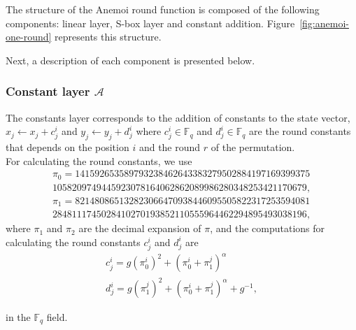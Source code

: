 The structure of the Anemoi round function is composed of the following components: linear layer, S-box layer and constant addition. Figure~\ref{fig:anemoi-one-round} represents this structure.

Next, a description of each component is presented below.

\subsubsection*{Constant layer $\mathcal{A}$}
The constants layer corresponds to the addition of constants to the state vector, $x_j\leftarrow x_j+c_j^i$ and $y_j\leftarrow y_j+d_j^i$ where $c_j^i\in\mathbb{F}_q$ and $d_j^i\in\mathbb{F}_q$ are the round constants that depends on the position $i$ and the round $r$ of the permutation.\\
For calculating the round constants, we use
\begin{multline*}
    \pi_0=141592653589793238462643383279502884197169399375\\1058209749445923078164062862089986280348253421170679,
\end{multline*}
\begin{multline*}
    \pi_1=821480865132823066470938446095505822317253594081\\2848111745028410270193852110555964462294895493038196,
\end{multline*}
where $\pi_1$ and $\pi_2$ are the decimal expansion of $\pi$, and the computations for calculating the round constants $c_j^i$ and $d_j^i$ are
\begin{align}
    c_j^i=g\left(\pi_0^i\right)^2+\left(\pi_0^i+\pi_1^j\right)^\alpha \\
    d_j^i=g\left(\pi_1^j\right)^2+\left(\pi_0^i+\pi_1^j\right)^\alpha+g^{-1},
\end{align}

in the $\mathbb{F}_q$ field.

